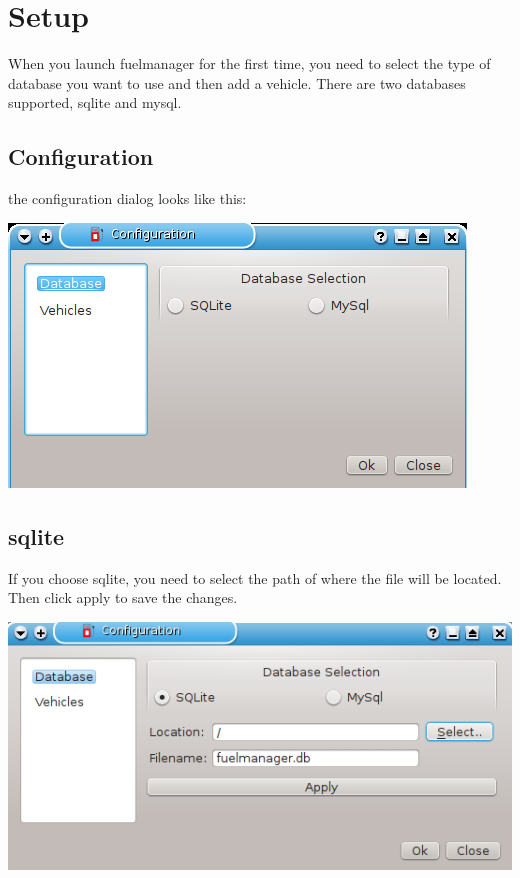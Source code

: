 \chapter{Setup}
When you launch fuelmanager for the first time, you need to select the type of database
you want to use and then add a vehicle.  There are two databases supported, sqlite and mysql.

\section{Configuration}
the configuration dialog looks like this:
  \begin{center}
    \includegraphics{snapshot11}
  \end{center}

\section{sqlite}
If you choose sqlite, you need to select the path of where the file will be located.
Then click apply to save the changes.
  \begin{center}
    \includegraphics{snapshot2}
  \end{center}

